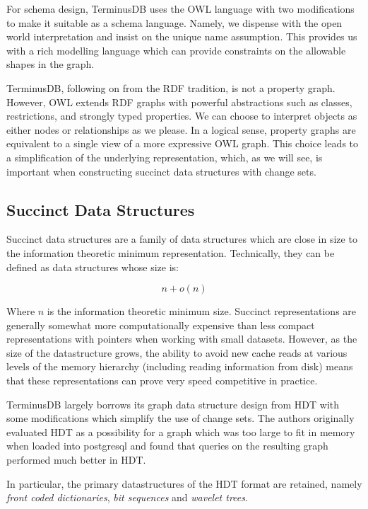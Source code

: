 \documentclass[10pt, a4paper, twocolumn]{article} %
\begin{document}
For schema design, TerminusDB uses the OWL language with two
modifications to make it suitable as a schema language. Namely, we
dispense with the open world interpretation and insist on the unique
name assumption\autocite{DBLP:journals/semweb/FeeneyMB18}. This provides
us with a rich modelling language which can provide constraints on the
allowable shapes in the graph.

TerminusDB, following on from the RDF tradition, is not a property
graph. However, OWL extends RDF graphs with powerful abstractions such
as classes, restrictions, and strongly typed properties. We can choose
to interpret objects as either nodes or relationships as we please. In
a logical sense, property graphs are equivalent to a single view of a
more expressive OWL graph. This choice leads to a simplification of
the underlying representation, which, as we will see, is important
when constructing succinct data structures with change sets.

\subsection{Succinct Data Structures}

Succinct data structures\autocite{Jacobson:1988:SSD:915547} are a family of
data structures which are close in size to the information theoretic
minimum representation. Technically, they can be defined as data structures
whose size is:

\[ n + o(n) \]

Where \(n\) is the information theoretic minimum size. Succinct
representations are generally somewhat more computationally expensive
than less compact representations with pointers when working with
small datasets. However, as the size of the datastructure grows, the
ability to avoid new cache reads at various levels of the memory
hierarchy (including reading information from disk) means that these
representations can prove very speed
competitive\autocite{doi:10.1002/spe.2198} in practice.

TerminusDB largely borrows its graph data structure design from
HDT\autocite{10.1007/978-3-642-30284-8_36} with some modifications which
simplify the use of change sets. The authors originally evaluated HDT
as a possibility for a graph which was too large to fit in memory when
loaded into postgresql and found that queries on the resulting graph
performed much better in HDT\autocite{gleason_feeney2018}.

In particular, the primary datastructures of the HDT format are
retained, namely {\em front coded dictionaries}, {\em bit sequences}
and {\em wavelet trees}.
\end{document}
